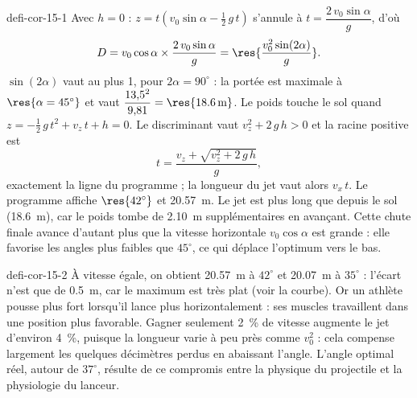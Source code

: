 \begin{blocEdition}{defi-cor-15-1}
Avec $h=0$ : $z=t\left(v_0\sin\alpha-\frac12\,g\,t\right)$ s'annule à $t=\dfrac{2\,v_0\sin\alpha}{g}$, d'où
\[D=v_0\cos\alpha\times\frac{2\,v_0\sin\alpha}{g}=\res{\frac{v_0^2\sin(2\alpha)}{g}}.\]
$\sin(2\alpha)$ vaut au plus 1, pour $2\alpha=90^\circ$ : la portée est maximale à $\res{\alpha=45^\circ}$ et vaut
$\dfrac{13{,}5^2}{9{,}81}=\res{\qty{18,6}{m}}$.
Le poids touche le sol quand $z=-\frac12\,g\,t^2+v_z\,t+h=0$. Le discriminant vaut $v_z^2+2\,g\,h>0$ et la racine positive
est
\[t=\frac{v_z+\sqrt{v_z^2+2\,g\,h}}{g},\]
exactement la ligne du programme ; la longueur du jet vaut alors $v_x\,t$.
Le programme affiche $\res{42^\circ}$ et \qty{20,57}{m}. Le jet est plus long que depuis le sol (\qty{18,6}{m}), car le poids
tombe de \qty{2,10}{m} supplémentaires en avançant. Cette chute finale avance d'autant plus que la vitesse horizontale
$v_0\cos\alpha$ est grande : elle favorise les angles plus faibles que $45^\circ$, ce qui déplace l'optimum vers le bas.
\end{blocEdition}

\begin{blocEdition}{defi-cor-15-2}
\label{figedition-defi-cor-15-2-1}
À vitesse égale, on obtient \qty{20,57}{m} à $42^\circ$ et \qty{20,07}{m} à $35^\circ$ : l'écart n'est que de \qty{0,5}{m}, car le
maximum est très plat (voir la courbe). Or un athlète pousse plus fort lorsqu'il lance plus horizontalement : ses
muscles travaillent dans une position plus favorable. Gagner seulement 2~\% de vitesse augmente le jet d'environ
4~\%, puisque la longueur varie à peu près comme $v_0^2$ : cela compense largement les quelques décimètres perdus en
abaissant l'angle. L'angle optimal réel, autour de $37^\circ$, résulte de ce compromis entre la physique du projectile et
la physiologie du lanceur.
\end{blocEdition}

